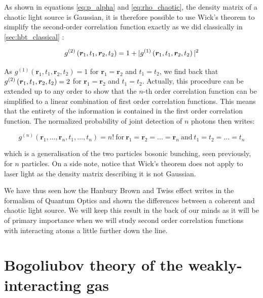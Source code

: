 As shown in equations \ref{eq:p_alpha} and \ref{eq:rho_chaotic}, the density matrix of a chaotic light source is Gaussian, it is therefore possible to use Wick's theorem to simplify the second-order correlation function exactly as we did classically in \ref{sec:hbt_classical} :

\begin{equation}
    g^{(2)} \left(\bm{r}_{1}, t_{1}, \bm{r}_{2}, t_{2}\right) = 1 + |g^{(1)}\left(\bm{r}_{1}, t_{1}, \bm{r}_{2}, t_{2}\right)|^2
\end{equation}

\noindent As $g^{(1)}\left(\bm{r}_{1}, t_{1}, \bm{r}_{2}, t_{2}\right)=1$ for $\bm{r}_1=\bm{r}_2$ and $t_1=t_2$, we find back that $g^{(2)} \left(\bm{r}_{1}, t_{1}, \bm{r}_{2}, t_{2}\right)=2$ for $\bm{r}_1=\bm{r}_2$ and $t_1=t_2$. Actually, this procedure can be extended up to any order to show that the $n$-th order correlation function can be simplified to a linear combination of first order correlation functions. This means that the entirety of the information is contained in the first order correlation function. The normalized probability of joint detection of $n$ photons then writes:

\begin{equation}
    g^{(n)} (\bm{r}_1,...,\bm{r}_n,t_1,...,t_n) = n! \ \mathrm{for} \ \bm{r}_1=\bm{r}_2= ... =\bm{r}_n \ \mathrm{and} \ t_1=t_2=...=t_n
\end{equation}

\noindent which is a generalisation of the two particles bosonic bunching, seen previously, for $n$ particles. On a side note, notice that Wick's theorem does not apply to laser light as the density matrix describing it is not Gaussian.

We have thus seen how the Hanbury Brown and Twiss effect writes in the formalism of Quantum Optics and shown the differences between a coherent and chaotic light source. We will keep this result in the back of our minds as it will be of primary importance when we will study second order correlation functions with interacting atoms a little further down the line.



\section{Bogoliubov theory of the weakly-interacting gas}

